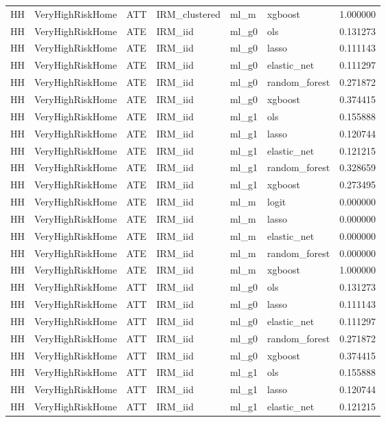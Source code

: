 \begin{longtable}{llllllr}
HH & VeryHighRiskHome & ATT & IRM\_clustered & ml\_m & xgboost & 1.000000 \\
HH & VeryHighRiskHome & ATE & IRM\_iid & ml\_g0 & ols & 0.131273 \\
HH & VeryHighRiskHome & ATE & IRM\_iid & ml\_g0 & lasso & 0.111143 \\
HH & VeryHighRiskHome & ATE & IRM\_iid & ml\_g0 & elastic\_net & 0.111297 \\
HH & VeryHighRiskHome & ATE & IRM\_iid & ml\_g0 & random\_forest & 0.271872 \\
HH & VeryHighRiskHome & ATE & IRM\_iid & ml\_g0 & xgboost & 0.374415 \\
HH & VeryHighRiskHome & ATE & IRM\_iid & ml\_g1 & ols & 0.155888 \\
HH & VeryHighRiskHome & ATE & IRM\_iid & ml\_g1 & lasso & 0.120744 \\
HH & VeryHighRiskHome & ATE & IRM\_iid & ml\_g1 & elastic\_net & 0.121215 \\
HH & VeryHighRiskHome & ATE & IRM\_iid & ml\_g1 & random\_forest & 0.328659 \\
HH & VeryHighRiskHome & ATE & IRM\_iid & ml\_g1 & xgboost & 0.273495 \\
HH & VeryHighRiskHome & ATE & IRM\_iid & ml\_m & logit & 0.000000 \\
HH & VeryHighRiskHome & ATE & IRM\_iid & ml\_m & lasso & 0.000000 \\
HH & VeryHighRiskHome & ATE & IRM\_iid & ml\_m & elastic\_net & 0.000000 \\
HH & VeryHighRiskHome & ATE & IRM\_iid & ml\_m & random\_forest & 0.000000 \\
HH & VeryHighRiskHome & ATE & IRM\_iid & ml\_m & xgboost & 1.000000 \\
HH & VeryHighRiskHome & ATT & IRM\_iid & ml\_g0 & ols & 0.131273 \\
HH & VeryHighRiskHome & ATT & IRM\_iid & ml\_g0 & lasso & 0.111143 \\
HH & VeryHighRiskHome & ATT & IRM\_iid & ml\_g0 & elastic\_net & 0.111297 \\
HH & VeryHighRiskHome & ATT & IRM\_iid & ml\_g0 & random\_forest & 0.271872 \\
HH & VeryHighRiskHome & ATT & IRM\_iid & ml\_g0 & xgboost & 0.374415 \\
HH & VeryHighRiskHome & ATT & IRM\_iid & ml\_g1 & ols & 0.155888 \\
HH & VeryHighRiskHome & ATT & IRM\_iid & ml\_g1 & lasso & 0.120744 \\
HH & VeryHighRiskHome & ATT & IRM\_iid & ml\_g1 & elastic\_net & 0.121215 \\

\end{longtable}
